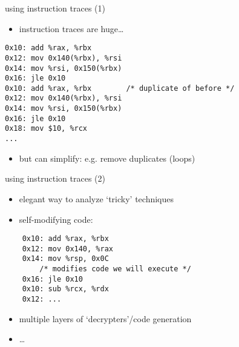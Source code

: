 \begin{frame}[fragile,label=instrTraces1]{using instruction traces (1)}
\begin{itemize}
\item instruction traces are huge\ldots
\end{itemize}
\begin{lstlisting}
0x10: add %rax, %rbx
0x12: mov 0x140(%rbx), %rsi
0x14: mov %rsi, 0x150(%rbx)
0x16: jle 0x10
0x10: add %rax, %rbx        /* duplicate of before */
0x12: mov 0x140(%rbx), %rsi
0x14: mov %rsi, 0x150(%rbx)
0x16: jle 0x10
0x18: mov $10, %rcx
...
\end{lstlisting}
\begin{itemize}
\item but can simplify: e.g. remove duplicates (loops)
\end{itemize}
\end{frame}

\begin{frame}[fragile,label=instrTraces2]{using instruction traces (2)}
\begin{itemize}
\item elegant way to analyze `tricky' techniques
\item self-modifying code:
\end{itemize}
\begin{lstlisting}
    0x10: add %rax, %rbx
    0x12: mov 0x140, %rax
    0x14: mov %rsp, 0x0C
        /* modifies code we will execute */
    0x16: jle 0x10
    0x10: sub %rcx, %rdx
    0x12: ...
\end{lstlisting}
\begin{itemize}
\item multiple layers of `decrypters'/code generation
\item \ldots
\end{itemize}
\end{frame}

